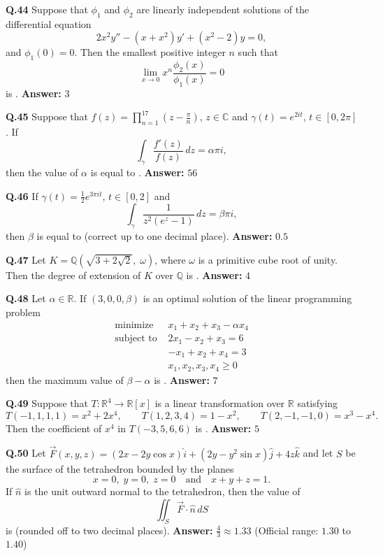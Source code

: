 \documentclass[11pt,a4paper]{article}
\newcommand{\ans}[1]{\textbf{Answer:} #1\par\medskip}
\begin{document}
\textbf{Q.44} Suppose that $\phi_1$ and $\phi_2$ are linearly independent solutions of the differential equation
\[
  2x^2 y'' - (x + x^2) y' + (x^2 - 2) y = 0,
\]
and $\phi_1(0) = 0$. Then the smallest positive integer $n$ such that
\[
  \lim_{x\to 0} x^n \frac{\phi_2(x)}{\phi_1(x)} = 0
\]
is \underline{\hspace{2cm}}.
\ans{$3$}

\textbf{Q.45} Suppose that $f(z) = \prod_{n=1}^{17} \left(z - \frac{\pi}{n}\right)$, $z \in \mathbb{C}$ and $\gamma(t) = e^{2it}$, $t \in [0, 2\pi]$. If
\[
  \int_\gamma \frac{f'(z)}{f(z)}\,dz = \alpha \pi i,
\]
then the value of $\alpha$ is equal to \underline{\hspace{2cm}}.
\ans{$56$}

\textbf{Q.46} If $\gamma(t) = \frac{1}{2} e^{3\pi i t}$, $t \in [0, 2]$ and
\[
  \int_\gamma \frac{1}{z^2 (e^z - 1)}\,dz = \beta \pi i,
\]
then $\beta$ is equal to \underline{\hspace{2cm}} (correct up to one decimal place).
\ans{$0.5$}

\textbf{Q.47} Let $K = \mathbb{Q}\!\left(\sqrt{3 + 2\sqrt{2}},\; \omega\right)$, where $\omega$ is a primitive cube root of unity. Then the degree of extension of $K$ over $\mathbb{Q}$ is \underline{\hspace{2cm}}.
\ans{$4$}

\textbf{Q.48} Let $\alpha \in \mathbb{R}$. If $(3, 0, 0, \beta)$ is an optimal solution of the linear programming problem
\begin{align*}
  \text{minimize } & x_1 + x_2 + x_3 - \alpha x_4 \\
  \text{subject to } & 2x_1 - x_2 + x_3 = 6 \\
                     & -x_1 + x_2 + x_4 = 3 \\
                     & x_1, x_2, x_3, x_4 \ge 0
\end{align*}
then the maximum value of $\beta - \alpha$ is \underline{\hspace{2cm}}.
\ans{$7$}

\textbf{Q.49} Suppose that $T : \mathbb{R}^4 \to \mathbb{R}[x]$ is a linear transformation over $\mathbb{R}$ satisfying
\[
  T(-1, 1, 1, 1) = x^2 + 2x^4, \qquad T(1, 2, 3, 4) = 1 - x^2, \qquad T(2, -1, -1, 0) = x^3 - x^4.
\]
Then the coefficient of $x^4$ in $T(-3, 5, 6, 6)$ is \underline{\hspace{2cm}}.
\ans{$5$}

\textbf{Q.50} Let $\vec{F}(x, y, z) = (2x - 2y\cos x)\hat{i} + (2y - y^2 \sin x)\hat{j} + 4z\hat{k}$ and let $S$ be the surface of the tetrahedron bounded by the planes
\[
  x = 0,\; y = 0,\; z = 0 \quad \text{and} \quad x + y + z = 1.
\]
If $\hat{n}$ is the unit outward normal to the tetrahedron, then the value of
\[
  \iint_S \vec{F} \cdot \hat{n}\,dS
\]
is \underline{\hspace{2cm}} (rounded off to two decimal places).
\ans{$\frac{4}{3} \approx 1.33$ (Official range: $1.30$ to $1.40$)}
\end{document}
